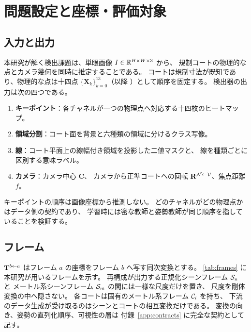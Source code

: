 \section{問題設定と座標・評価対象}
\label{sec:problem_setting}

\subsection{入力と出力}
\label{sec:task}

本研究が解く検出課題は、単眼画像 \(I\in\mathbb{R}^{H\times W\times 3}\) から、
規制コートの物理的な点とカメラ幾何を同時に推定することである。
コートは規制寸法が既知であり、物理的な点は十四点
\(\{\mathbf{X}_k\}_{k=0}^{13}\)（以降 \KPName）として順序を固定する。
検出器の出力は次の四つである。

\begin{enumerate}[leftmargin=1.6em]
  \item \textbf{キーポイント}：各チャネルが一つの物理点へ対応する十四枚のヒートマップ。
  \item \textbf{領域分割}：コート面を背景と六種類の領域に分けるクラス写像。
  \item \textbf{線}：コート平面上の線幅付き領域を投影した二値マスクと、
  線を種類ごとに区別する意味ラベル。
  \item \textbf{カメラ}：カメラ中心 \(\mathbf{C}\)、
  カメラから正準コートへの回転 \(\mathbf{R}^{\mathcal{N}\leftarrow \mathcal{V}}\)、焦点距離 \(f\)。
\end{enumerate}

キーポイントの順序は画像座標から推測しない。
どのチャネルがどの物理点かはデータ側の契約であり、
学習時には密な教師と姿勢教師が同じ順序を指していることを検証する。

\subsection{フレーム}
\label{sec:frames}

\(\mathbf{T}^{b\leftarrow a}\) はフレーム \(a\) の座標をフレーム \(b\) へ写す同次変換とする。
\cref{tab:frames} に本研究が用いるフレームを示す。
再構成が出力する正規化シーンフレーム \(\mathcal{S}_n\) と
メートル系シーンフレーム \(\mathcal{S}_m\) の間には一様な尺度だけを置き、
尺度を剛体変換の中へ隠さない。
各コートは固有のメートル系フレーム \(\mathcal{C}_i\) を持ち、
下流のデータ生成が受け取るのはシーンとコートの相互変換だけである。
変換の向き、姿勢の直列化順序、可視性の層は
付録~\ref{app:contracts} に完全な契約として記す。



